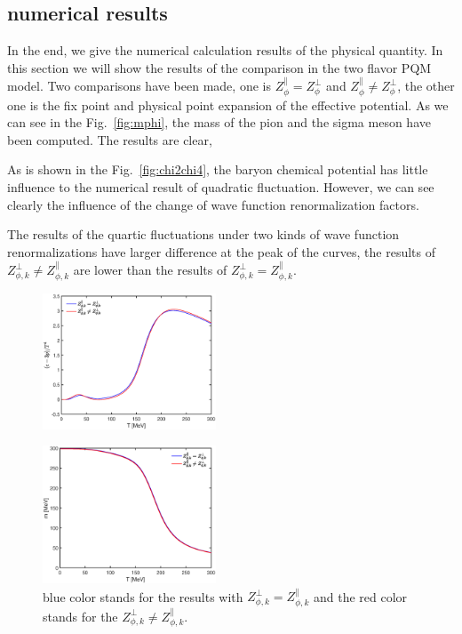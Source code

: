 \documentclass[%
reprint,
superscriptaddress,
showpacs,preprintnumbers,
 amsmath,amssymb,
 aps,
prd,
]{revtex4-1}
\def\Fig#1{Fig.~\ref{#1}} \def\Tab#1{Tab.~\ref{#1}}
\begin{document}
\subsection{numerical results}
In the end, we give the numerical calculation results of the physical quantity. In this section we will show the results of the comparison in the two flavor PQM model. 
Two comparisons have been made, one is $Z^{\|}_{\phi}=Z^{\bot}_{\phi}$ and $Z^{\|}_{\phi}\neq Z^{\bot}_{\phi}$, the other one is the fix point and physical 
point expansion of the effective potential. As we can see in the \Fig{fig:mphi}, the mass of the pion and the sigma meson have been computed. The results are clear,


As is shown in the \Fig{fig:chi2chi4}, the baryon chemical potential has little influence to the numerical result of 
quadratic fluctuation. However, we can see clearly the influence of the change of wave function renormalization factors.


The results of the quartic fluctuations under two kinds of wave function renormalizations have larger difference at the peak
 of the curves, the results of $Z^{\bot}_{\phi,k}\neq Z^{\|}_{\phi,k} $ are lower than the results of $Z^{\bot}_{\phi,k}= Z^{\|}_{\phi,k} $.












\begin{figure}[t]
\label{fig:trace}
\includegraphics[width=0.46\textwidth]{trace.eps}
\caption{}
\end{figure}







\begin{figure}[t]
\includegraphics[width=0.46\textwidth]{mf.eps}
\caption{blue color stands for the results with $Z^{\bot}_{\phi,k}=Z^{\|}_{\phi,k}$ and the red color stands for the $Z^{\bot}
_{\phi,k}\neq Z^{\|}_{\phi,k} $.}
\label{fig:mf}
\end{figure}
\end{document}
